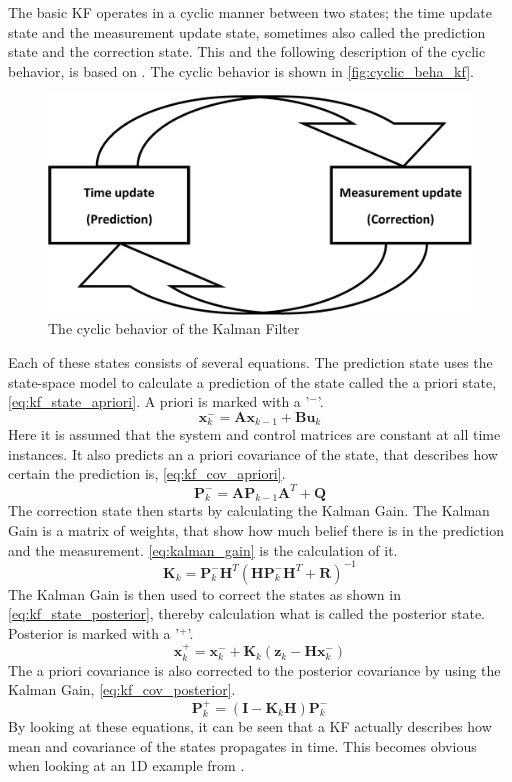 \documentclass[Main]{subfiles}
\begin{document}
The basic KF operates in a cyclic manner between two states; the time update state and the measurement update state, sometimes also called the prediction state and the correction state. 
This and the following description of the cyclic behavior, is based on \cite{Simon2006}.
The cyclic behavior is shown in \autoref{fig:cyclic_beha_kf}.
\begin{figure}[H]
	\centering
	\includegraphics[width=0.5\linewidth]{./Figures/kf_states.png}
	\caption{The cyclic behavior of the Kalman Filter}
	\label{fig:cyclic_beha_kf}
\end{figure}\noindent
Each of these states consists of several equations. The prediction state uses the state-space model to calculate a prediction of the state called the a priori state, \autoref{eq:kf_state_apriori}.
A priori is marked with a '$^-$'.
\begin{equation}
\label{eq:kf_state_apriori}
\mathbf{x}_k^-=\mathbf{A} \mathbf{x}_{k-1} + \mathbf{B} \mathbf{u}_k
\end{equation}
Here it is assumed that the system and control matrices are constant at all time instances.
It also predicts an a priori covariance of the state, that describes how certain the prediction is, \autoref{eq:kf_cov_apriori}.
\begin{equation}
\label{eq:kf_cov_apriori}
\mathbf{P}_k^-=\mathbf{A} \mathbf{P}_{k-1} \mathbf{A}^T+\mathbf{Q}
\end{equation}
The correction state then starts by calculating the Kalman Gain. 
The Kalman Gain is a matrix of weights, that show how much belief there is in the prediction and the measurement. \autoref{eq:kalman_gain} is the calculation of it.
\begin{equation}
\label{eq:kalman_gain}
\mathbf{K}_k = \mathbf{P}_k^- \mathbf{H}^T (\mathbf{H} \mathbf{P}_k^- \mathbf{H}^T + \mathbf{R})^{-1}
\end{equation}
The Kalman Gain is then used to correct the states as shown in \autoref{eq:kf_state_posterior}, thereby calculation what is called the posterior state. 
Posterior is marked with a '$^+$'.
\begin{equation}
\label{eq:kf_state_posterior}
\mathbf{x}_k^+ = \mathbf{x}_k^- + \mathbf{K}_k (\mathbf{z}_k - \mathbf{H} \mathbf{x}_k^-)
\end{equation}
The a priori covariance is also corrected to the posterior covariance by using the Kalman Gain, \autoref{eq:kf_cov_posterior}.
\begin{equation}
\label{eq:kf_cov_posterior}
\mathbf{P}_k^+ = (\mathbf{I} - \mathbf{K}_k \mathbf{H}) \mathbf{P}_k^-
\end{equation}
By looking at these equations, it can be seen that a KF actually describes how mean and covariance of the states propagates in time.
This becomes obvious when looking at an 1D example from \citep{Thrun2002}.
\end{document}

